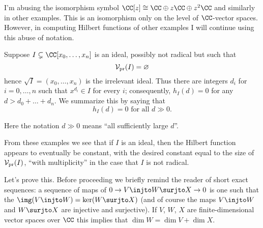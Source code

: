 \begin{abuse}
	I'm abusing the isomorphism symbol
	$\CC[z] \cong \CC \oplus z\CC \oplus z^2\CC$ and similarly
	in other examples.
	This is an isomorphism only on the level of $\CC$-vector spaces.
	However, in computing Hilbert functions of other examples
	I will continue using this abuse of notation.
\end{abuse}
\begin{example}
	Suppose $I \subsetneq \CC[x_0, \dots, x_n]$
	is an ideal, possibly not radical
	but such that \[ \mathcal V_{\text{pr}}(I) = \varnothing \]
	hence $\sqrt I = (x_0, \dots, x_n)$ is the irrelevant ideal.
	Thus there are integers $d_i$ for $i=0,\dots,n$ such that
	$x^{d_i} \in I$ for every $i$; consequently, $h_I(d) = 0$
	for any $d > d_0 + \dots + d_n$.
	We summarize this by saying that
	\[ h_I(d) = 0 \text{ for all $d \gg 0$}. \]
\end{example}
Here the notation $d\gg 0$ means ``all sufficiently large $d$''.

From these examples we see that if $I$ is an ideal,
then the Hilbert function appears to eventually be constant,
with the desired constant equal to the size of $\mathcal V_{\text{pr}}(I)$,
``with multiplicity'' in the case that $I$ is not radical.

Let's prove this.
Before proceeding we briefly remind the reader of short exact sequences:
a sequence of maps of $0 \to V \injto W \surjto X \to 0$
is one such that the $\img(V \injto W) = \ker(W \surjto X)$
(and of course the maps $V \injto W$ and $W \surjto X$ are
injective and surjective).
If $V$, $W$, $X$ are finite-dimensional vector spaces over $\CC$
this implies that $\dim W = \dim V + \dim X$.

